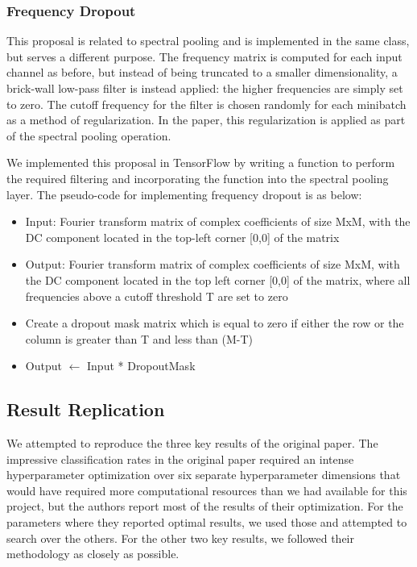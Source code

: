 \documentclass[10pt,journal,compsoc]{IEEEtran}
\begin{document}
\subsubsection{Frequency Dropout}

This proposal is related to spectral pooling and is implemented in the same class, but serves a different purpose. The frequency matrix is computed for each input channel as before, but instead of being truncated to a smaller dimensionality, a brick-wall low-pass filter is instead applied: the higher frequencies are simply set to zero. The cutoff frequency for the filter is chosen randomly for each minibatch as a method of regularization. In the paper, this regularization is applied as part of the spectral pooling operation.

We implemented this proposal in TensorFlow by writing a function to perform the required filtering and incorporating the function into the spectral pooling layer. The pseudo-code for implementing frequency dropout is as below:
\begin{itemize}
    \item Input: Fourier transform matrix of complex coefficients of size MxM, with the DC component located in the top-left corner [0,0] of the matrix
    \item Output: Fourier transform matrix of complex coefficients of size MxM, with the DC component located in the top left corner [0,0] of the matrix, where all frequencies above a cutoff threshold T are set to zero
    \item Create a dropout mask matrix which is equal to zero if either the row or the column is greater than T and less than (M-T)
    \item Output $\leftarrow$ Input * DropoutMask
\end{itemize}

\subsection{Result Replication}

We attempted to reproduce the three key results of the original paper. The impressive classification rates in the original paper required an intense hyperparameter optimization over six separate hyperparameter dimensions that would have required more computational resources than we had available for this project, but the authors report most of the results of their optimization. For the parameters where they reported optimal results, we used those and attempted to search over the others. For the other two key results, we followed their methodology as closely as possible.
\end{document}
